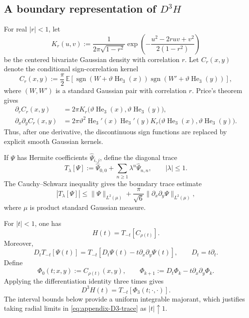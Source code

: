 \subsection{A boundary representation of $D^3H$}
\label{app:certification-boundary-representation}

For real $|r|<1$, let
\[
  K_r(u,v)
  :=\frac{1}{2\pi\sqrt{1-r^2}}
  \exp\!\left(-\frac{u^2-2ruv+v^2}{2(1-r^2)}\right)
\]
be the centered bivariate Gaussian density with correlation $r$.  Let
$C_r(x,y)$ denote the conditional sign-correlation kernel
\[
  C_r(x,y)
  :=\frac{\pi}{2}\,
  \mathbb E\!\left[
  \operatorname{sgn}(W+\vartheta\operatorname{He}_3(x))
  \operatorname{sgn}(W'+\vartheta\operatorname{He}_3(y))
  \right],
\]
where $(W,W')$ is a standard Gaussian pair with correlation $r$.  Price's
theorem gives
\begin{align}
  \partial_rC_r(x,y)
  &=2\pi K_r\bigl(\vartheta\operatorname{He}_3(x),
                   \vartheta\operatorname{He}_3(y)\bigr),
  \label{eq:appendix-price-r}\\
  \partial_x\partial_yC_r(x,y)
  &=2\pi\vartheta^2\operatorname{He}_3'(x)
  \operatorname{He}_3'(y)
  K_r\bigl(\vartheta\operatorname{He}_3(x),
           \vartheta\operatorname{He}_3(y)\bigr).
  \label{eq:appendix-price-xy}
\end{align}
Thus, after one derivative, the discontinuous sign functions are replaced by
explicit smooth Gaussian kernels.

If $\Psi$ has Hermite coefficients $\widehat\Psi_{i,j}$, define the diagonal
trace
\[
  T_\lambda[\Psi]
  :=\widehat\Psi_{0,0}+\sum_{n\ge1}\lambda^n\widehat\Psi_{n,n},
  \qquad |\lambda|\le1.
\]
The Cauchy--Schwarz inequality gives the boundary trace estimate
\begin{equation}
  |T_\lambda[\Psi]|
  \le
  \|\Psi\|_{L^2(\mu)}
  +\frac{\pi}{\sqrt6}
  \|\partial_x\partial_y\Psi\|_{L^2(\mu)},
  \label{eq:appendix-trace-bound}
\end{equation}
where $\mu$ is product standard Gaussian measure.

For $|t|<1$, one has
\[
  H(t)=T_{-t}[C_{\rho(t)}].
\]
Moreover,
\[
  D_tT_{-t}[\Psi(t)]
  =T_{-t}\!\left[D_t\Psi(t)-t\partial_x\partial_y\Psi(t)\right],
  \qquad D_t=t\partial_t.
\]
Define
\[
  \Phi_0(t;x,y):=C_{\rho(t)}(x,y),
  \qquad
  \Phi_{k+1}:=D_t\Phi_k-t\partial_x\partial_y\Phi_k.
\]
Applying the differentiation identity three times gives
\begin{equation}
  D^3H(t)=T_{-t}[\Phi_3(t;\cdot,\cdot)].
  \label{eq:appendix-D3-trace}
\end{equation}
The interval bounds below provide a uniform integrable majorant, which
justifies taking radial limits in \eqref{eq:appendix-D3-trace} as
$|t|\uparrow1$.

